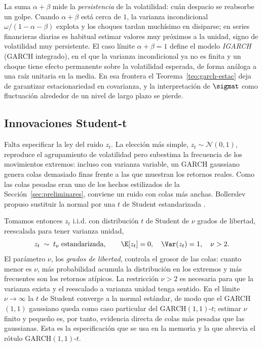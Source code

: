 La suma $\alpha + \beta$ mide la \emph{persistencia} de la volatilidad: cuán despacio se reabsorbe un golpe. Cuando $\alpha + \beta$ está cerca de $1$, la varianza incondicional $\omega/(1-\alpha-\beta)$ explota y los choques tardan muchísimo en disiparse; en series financieras diarias es habitual estimar valores muy próximos a la unidad, signo de volatilidad muy persistente. El caso límite $\alpha + \beta = 1$ define el modelo \emph{IGARCH} (GARCH integrado), en el que la varianza incondicional ya no es finita y un choque tiene efecto permanente sobre la volatilidad esperada, de forma análoga a una raíz unitaria en la media. En esa frontera el Teorema~\ref{teo:garch-estac} deja de garantizar estacionariedad en covarianza, y la interpretación de $\sigmat$ como fluctuación alrededor de un nivel de largo plazo se pierde.

\subsection{Innovaciones Student-t}
\label{sec:garch-t}

Falta especificar la ley del ruido $z_t$. La elección más simple, $z_t \sim \mathcal{N}(0,1)$, reproduce el agrupamiento de volatilidad pero subestima la frecuencia de los movimientos extremos: incluso con varianza variable, un GARCH gaussiano genera colas demasiado finas frente a las que muestran los retornos reales. Como las colas pesadas eran uno de los hechos estilizados de la Sección~\ref{sec:preliminares}, conviene un ruido con colas más anchas. Bollerslev propuso sustituir la normal por una $t$ de Student estandarizada \cite{bollerslev1987}.

Tomamos entonces $z_t$ i.i.d. con distribución $t$ de Student de $\nu$ grados de libertad, reescalada para tener varianza unidad,
\[
z_t \;\sim\; t_\nu \;\text{estandarizada}, \qquad \E[z_t] = 0, \quad \Var(z_t) = 1, \quad \nu > 2.
\]
El parámetro $\nu$, los \emph{grados de libertad}, controla el grosor de las colas: cuanto menor es $\nu$, más probabilidad acumula la distribución en los extremos y más frecuentes son los retornos atípicos. La restricción $\nu > 2$ es necesaria para que la varianza exista y el reescalado a varianza unidad tenga sentido. En el límite $\nu \to \infty$ la $t$ de Student converge a la normal estándar, de modo que el GARCH$(1,1)$ gaussiano queda como caso particular del GARCH$(1,1)$-$t$; estimar $\nu$ finito y pequeño es, por tanto, evidencia directa de colas más pesadas que las gaussianas. Esta es la especificación que se usa en la memoria y la que abrevia el rótulo GARCH$(1,1)$-$t$.

